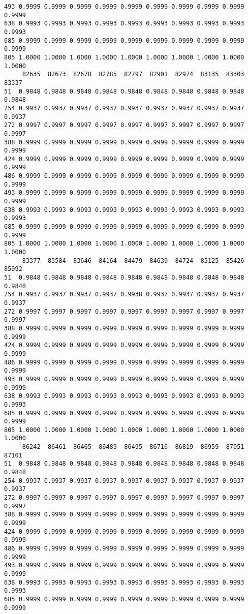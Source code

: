 \documentclass[
]{report}
\begin{document}
\begin{verbatim}
493 0.9999 0.9999 0.9999 0.9999 0.9999 0.9999 0.9999 0.9999 0.9999 0.9999
638 0.9993 0.9993 0.9993 0.9993 0.9993 0.9993 0.9993 0.9993 0.9993 0.9993
685 0.9999 0.9999 0.9999 0.9999 0.9999 0.9999 0.9999 0.9999 0.9999 0.9999
805 1.0000 1.0000 1.0000 1.0000 1.0000 1.0000 1.0000 1.0000 1.0000 1.0000
     82635  82673  82678  82785  82797  82901  82974  83135  83303  83337
51  0.9848 0.9848 0.9848 0.9848 0.9848 0.9848 0.9848 0.9848 0.9848 0.9848
254 0.9937 0.9937 0.9937 0.9937 0.9937 0.9937 0.9937 0.9937 0.9937 0.9937
272 0.9997 0.9997 0.9997 0.9997 0.9997 0.9997 0.9997 0.9997 0.9997 0.9997
388 0.9999 0.9999 0.9999 0.9999 0.9999 0.9999 0.9999 0.9999 0.9999 0.9999
424 0.9999 0.9999 0.9999 0.9999 0.9999 0.9999 0.9999 0.9999 0.9999 0.9999
486 0.9999 0.9999 0.9999 0.9999 0.9999 0.9999 0.9999 0.9999 0.9999 0.9999
493 0.9999 0.9999 0.9999 0.9999 0.9999 0.9999 0.9999 0.9999 0.9999 0.9999
638 0.9993 0.9993 0.9993 0.9993 0.9993 0.9993 0.9993 0.9993 0.9993 0.9993
685 0.9999 0.9999 0.9999 0.9999 0.9999 0.9999 0.9999 0.9999 0.9999 0.9999
805 1.0000 1.0000 1.0000 1.0000 1.0000 1.0000 1.0000 1.0000 1.0000 1.0000
     83377  83584  83646  84164  84479  84639  84724  85125  85426  85992
51  0.9848 0.9848 0.9848 0.9848 0.9848 0.9848 0.9848 0.9848 0.9848 0.9848
254 0.9937 0.9937 0.9937 0.9937 0.9938 0.9937 0.9937 0.9937 0.9937 0.9937
272 0.9997 0.9997 0.9997 0.9997 0.9997 0.9997 0.9997 0.9997 0.9997 0.9997
388 0.9999 0.9999 0.9999 0.9999 0.9999 0.9999 0.9999 0.9999 0.9999 0.9999
424 0.9999 0.9999 0.9999 0.9999 0.9999 0.9999 0.9999 0.9999 0.9999 0.9999
486 0.9999 0.9999 0.9999 0.9999 0.9999 0.9999 0.9999 0.9999 0.9999 0.9999
493 0.9999 0.9999 0.9999 0.9999 0.9999 0.9999 0.9999 0.9999 0.9999 0.9999
638 0.9993 0.9993 0.9993 0.9993 0.9993 0.9993 0.9993 0.9993 0.9993 0.9993
685 0.9999 0.9999 0.9999 0.9999 0.9999 0.9999 0.9999 0.9999 0.9999 0.9999
805 1.0000 1.0000 1.0000 1.0000 1.0000 1.0000 1.0000 1.0000 1.0000 1.0000
     86242  86461  86465  86489  86495  86716  86819  86959  87051  87101
51  0.9848 0.9848 0.9848 0.9848 0.9848 0.9848 0.9848 0.9848 0.9848 0.9848
254 0.9937 0.9937 0.9937 0.9937 0.9937 0.9937 0.9937 0.9937 0.9937 0.9937
272 0.9997 0.9997 0.9997 0.9997 0.9997 0.9997 0.9997 0.9997 0.9997 0.9997
388 0.9999 0.9999 0.9999 0.9999 0.9999 0.9999 0.9999 0.9999 0.9999 0.9999
424 0.9999 0.9999 0.9999 0.9999 0.9999 0.9999 0.9999 0.9999 0.9999 0.9999
486 0.9999 0.9999 0.9999 0.9999 0.9999 0.9999 0.9999 0.9999 0.9999 0.9999
493 0.9999 0.9999 0.9999 0.9999 0.9999 0.9999 0.9999 0.9999 0.9999 0.9999
638 0.9993 0.9993 0.9993 0.9993 0.9993 0.9993 0.9993 0.9993 0.9993 0.9993
685 0.9999 0.9999 0.9999 0.9999 0.9999 0.9999 0.9999 0.9999 0.9999 0.9999

\end{verbatim}
\end{document}
